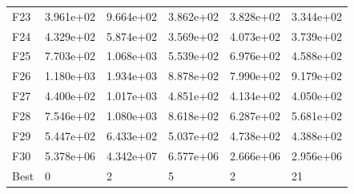 \begin{tabular}{llllll}
F23  &  3.961e+02 &  9.664e+02 &  3.862e+02 &  3.828e+02 &  3.344e+02 \\
F24  &  4.329e+02 &  5.874e+02 &  3.569e+02 &  4.073e+02 &  3.739e+02 \\
F25  &  7.703e+02 &  1.068e+03 &  5.539e+02 &  6.976e+02 &  4.588e+02 \\
F26  &  1.180e+03 &  1.934e+03 &  8.878e+02 &  7.990e+02 &  9.179e+02 \\
F27  &  4.400e+02 &  1.017e+03 &  4.851e+02 &  4.134e+02 &  4.050e+02 \\
F28  &  7.546e+02 &  1.080e+03 &  8.618e+02 &  6.287e+02 &  5.681e+02 \\
F29  &  5.447e+02 &  6.433e+02 &  5.037e+02 &  4.738e+02 &  4.388e+02 \\
F30  &  5.378e+06 &  4.342e+07 &  6.577e+06 &  2.666e+06 &  2.956e+06 \\
Best &          0 &          2 &          5 &          2 &         21 \\
\bottomrule
\end{tabular}
